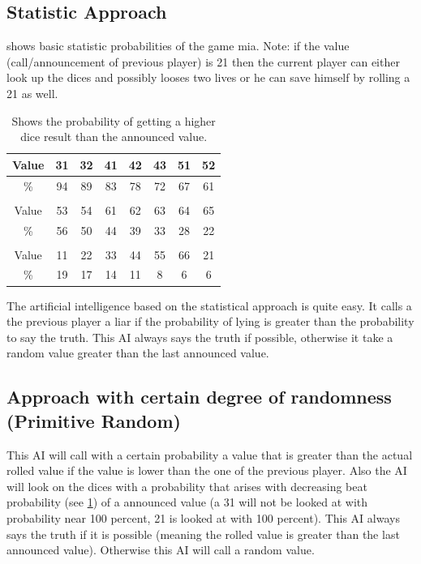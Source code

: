 \documentclass[11pt]{article}
\begin{document}
\subsection{Statistic Approach}
\label{ssec:statistic}
 shows basic statistic probabilities of the game mia. Note: if the value (call/announcement of previous player) is 21 then the current player can either look up the dices and possibly looses two lives or he can save himself by rolling a 21 as well. 

\begin{table}[H]
	\centering
	\small 
	\begin{tabular}{|c|c|c|c|c|c|c|c|}
		\hline 
		Value&31&32&41&42&43&51&52\\ \hline
		\%&94&89&83&78&72&67&61\\ \hline 
		&&&&&&& \\ \hline
		Value&53&54&61&62&63&64&65\\ \hline
		\%&56&50&44&39&33&28&22\\ \hline 
		&&&&&&& \\ \hline
		Value&11&22&33&44&55&66&21\\ \hline
		\%&19&17&14&11&8&6&6 \\ \hline
				
	\end{tabular}
	\caption{Shows the probability of getting a higher dice result than the announced value.}
	\label{tbl:stat1}
\end{table}

The artificial intelligence based on the statistical approach is quite easy. It calls a the previous player a liar if the probability of lying is greater than the probability to say the truth.
This AI always says the truth if possible, otherwise it take a random value greater than the last announced value.


\subsection{Approach with certain degree of randomness (Primitive Random)}
\label{ssec:primitive}
This AI will call with a certain probability a value that is greater than the actual rolled value if the value is lower than the one of the previous player. Also the AI will look on the dices with a probability that arises with decreasing beat probability (see \cref{tbl:stat1}) of a announced value (a 31 will not be looked at with probability near 100 percent, 21 is looked at with 100 percent). This AI always says the truth if it is possible (meaning the rolled value is greater than the last announced value). Otherwise this AI will call a random value.
\end{document}
